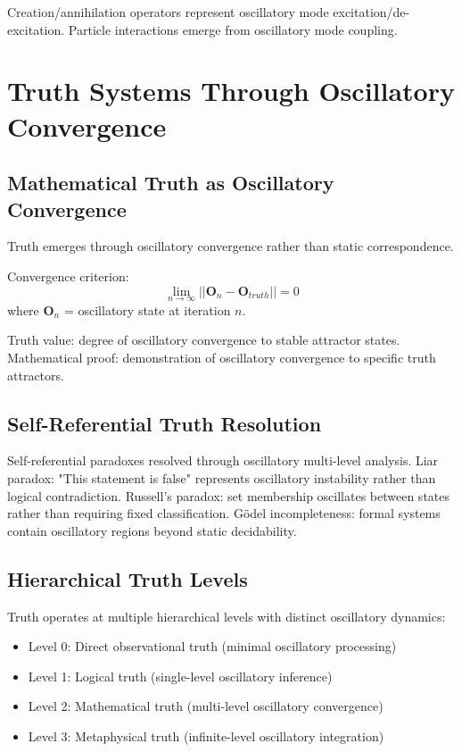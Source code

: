 \documentclass[12pt,a4paper]{article}
\begin{document}
Creation/annihilation operators represent oscillatory mode excitation/de-excitation. Particle interactions emerge from oscillatory mode coupling.

\section{Truth Systems Through Oscillatory Convergence}

\subsection{Mathematical Truth as Oscillatory Convergence}

Truth emerges through oscillatory convergence rather than static correspondence.

Convergence criterion:
\begin{equation}
\lim_{n \to \infty} ||\mathbf{O}_n - \mathbf{O}_{truth}|| = 0
\end{equation}
where $\mathbf{O}_n$ = oscillatory state at iteration $n$.

Truth value: degree of oscillatory convergence to stable attractor states. Mathematical proof: demonstration of oscillatory convergence to specific truth attractors.

\subsection{Self-Referential Truth Resolution}

Self-referential paradoxes resolved through oscillatory multi-level analysis. Liar paradox: "This statement is false" represents oscillatory instability rather than logical contradiction. Russell's paradox: set membership oscillates between states rather than requiring fixed classification. Gödel incompleteness: formal systems contain oscillatory regions beyond static decidability.

\subsection{Hierarchical Truth Levels}

Truth operates at multiple hierarchical levels with distinct oscillatory dynamics:
\begin{itemize}
\item Level 0: Direct observational truth (minimal oscillatory processing)
\item Level 1: Logical truth (single-level oscillatory inference)
\item Level 2: Mathematical truth (multi-level oscillatory convergence)
\item Level 3: Metaphysical truth (infinite-level oscillatory integration)
\end{itemize}
\end{document}
